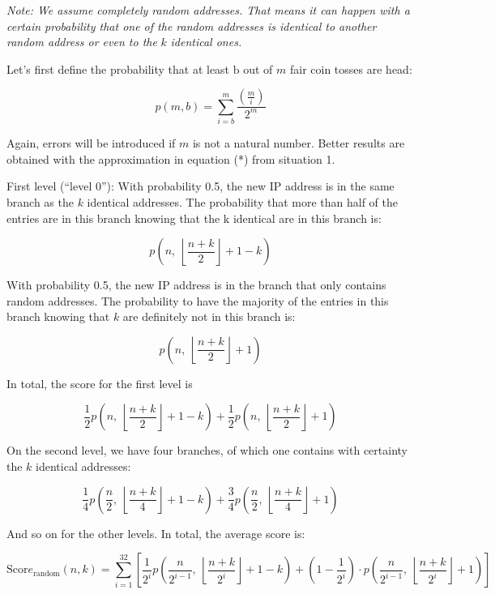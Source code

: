 \emph{Note: We assume completely random addresses. That means it can
happen with a certain probability that one of the random addresses is
identical to another random address or even to the} \(k\)
\emph{identical ones.}

Let's first define the probability that at least \(\text{b\ }\)out of
\(m\) fair coin tosses are head:

\[p(m,b) = \sum_{i = b}^{m}\frac{\left( \frac{m}{i} \right)}{2^{m}}\]

Again, errors will be introduced if \(m\) is not a natural number.
Better results are obtained with the approximation in equation (*) from
situation 1.

First level (``level 0''): With probability 0.5, the new IP address is
in the same branch as the \(k\) identical addresses. The probability
that more than half of the entries are in this branch knowing that
the\(\text{\ k}\) identical are in this branch is:

\[p\left( n,\ \left\lfloor \frac{n + k}{2} \right\rfloor + 1 - k \right)\]

With probability 0.5, the new IP address is in the branch that only
contains random addresses. The probability to have the majority of the
entries in this branch knowing that \(k\) are definitely not in this
branch is:

\[p\left( n,\ \left\lfloor \frac{n + k}{2} \right\rfloor + 1 \right)\]

In total, the score for the first level is

\[\frac{1}{2}p\left( n,\ \left\lfloor \frac{n + k}{2} \right\rfloor + 1 - k \right) + \frac{1}{2}p\left( n,\ \left\lfloor \frac{n + k}{2} \right\rfloor + 1 \right)\]

On the second level, we have four branches, of which one contains with
certainty the \(k\) identical addresses:

\[\frac{1}{4}p\left( \frac{n}{2},\ \left\lfloor \frac{n + k}{4} \right\rfloor + 1 - k \right) + \frac{3}{4}p\left( \frac{n}{2},\ \left\lfloor \frac{n + k}{4} \right\rfloor + 1 \right)\]

And so on for the other levels. In total, the average score is:

\[\text{Scor}e_{\text{random}}(n,k) = \sum_{i = 1}^{32}\left\lbrack \frac{1}{2^{i}}p\left( \frac{n}{2^{i - 1}},\ \left\lfloor \frac{n + k}{2^{i}} \right\rfloor + 1 - k \right) + \left( 1 - \frac{1}{2^{i}} \right) \cdot p\left( \frac{n}{2^{i - 1}},\ \left\lfloor \frac{n + k}{2^{i}} \right\rfloor + 1 \right) \right\rbrack\]

